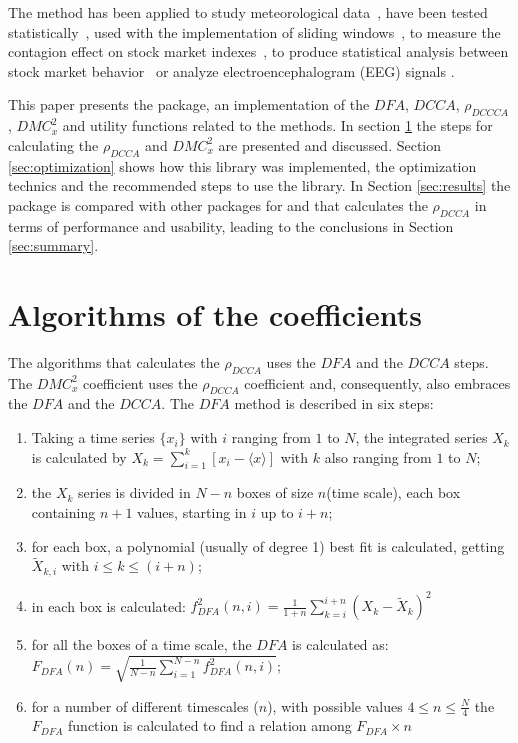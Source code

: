 \documentclass[article]{jss}
\begin{document}
The method has been applied to study meteorological data~\citep{Brito2019}, have been tested statistically~\citep{filho2021-2}, used with the implementation of sliding windows~\citep{guedes2021-2}, to measure the contagion effect on stock market indexes~\citep{guedes2022d}, to produce statistical analysis between stock market behavior~\citep{zebende2022s} or analyze electroencephalogram (EEG) signals \citep{RIBEIRO2025107419}.

This paper presents the   package, an implementation of the $DFA$, $DCCA$, $\rho_{DCCCA}$, $DMC_x^2$ and utility functions related to the methods. In section \ref{sec:calculations} the steps for calculating the $\rho_{DCCA}$ and $DMC_x^2$ are presented and discussed. Section \ref{sec:optimization} shows how this library was implemented, the optimization technics and the recommended steps to use the library. In Section \ref{sec:results} the  package is compared with other packages for  and  that calculates the $\rho_{DCCA}$ in terms of performance and usability, leading to the conclusions in Section \ref{sec:summary}.

\section{Algorithms of the coefficients}\label{sec:calculations}

The algorithms that calculates the $\rho_{DCCA}$ uses the $DFA$ and the $DCCA$ steps. The $DMC_x^2$ coefficient uses the $\rho_{DCCA}$ coefficient and, consequently, also embraces the $DFA$ and the $DCCA$. The $DFA$ method is described in six steps:


\begin{enumerate}\label{steps:dfa}

  \item Taking a time series $\{x_{i}\}$ with $i$ ranging from $1$ to $N$, the integrated series $X_{k}$ is calculated by $X_{k} = \sum_{i=1}^{k}\left[x_{i} - \langle x \rangle \right]$ with \(k\) also ranging from $1$ to $N$;
  \item the  $X_{k}$ series is divided in $N - n$ boxes of size $n$(time scale), each box containing $n + 1$ values, starting in $i$ up to $i + n$;
  \item for each box, a polynomial (usually of degree 1) best fit is calculated, getting $\widetilde{X}_{k, i}$ with $i \le k \le (i + n)$;
  \item in each box is calculated: $f_{DFA}^{2}(n, i) = \frac{1}{1+n} \sum_{k=i}^{i + n}(X_{k}-\widetilde{X}_{k})^{2}$
  \item for all the boxes of a time scale, the $DFA$ is calculated as:\\[10pt]
        $F_{DFA}(n) = \sqrt{\frac{1}{N - n} \sum_{i=1}^{N-n} f_{DFA}^{2}(n, i)}$;
  \item for a number of different timescales ($n$), with possible values $4 \le n \le \frac{N}{4}$ the $F_{DFA}$ function is calculated to find a relation among $F_{DFA} \times n$

\end{enumerate}
\end{document}
